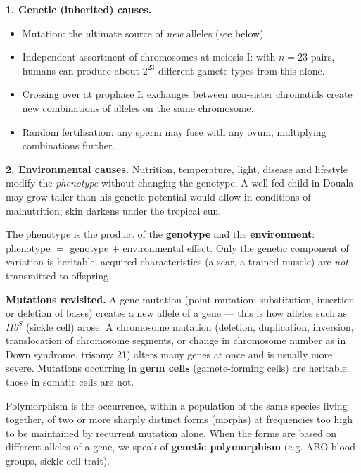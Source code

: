 \documentclass[11pt]{article}
\newcommand{\cle}[1]{{\popxbold\color{popdark}#1}}
\newcounter{popsec}
\newcounter{popsub}
\newcommand{\courssub}[1]{%
  \stepcounter{popsub}%
  \par\vspace{9pt}\noindent{\popxbold\fontsize{11.5}{13}\selectfont\color{popink}{\color{poporange}\thepopsec.\thepopsub}\hspace{6pt}#1}\par\nopagebreak\vspace{4pt}
}
\begin{document}
\textbf{1. Genetic (inherited) causes.}
\begin{itemize}
\item \cle{Mutation}: the ultimate source of \emph{new} alleles (see below).
\item \cle{Independent assortment} of chromosomes at meiosis I: with $n = 23$ pairs, humans can produce about $2^{23}$ different gamete types from this alone.
\item \cle{Crossing over} at prophase I: exchanges between non-sister chromatids create new combinations of alleles on the same chromosome.
\item \cle{Random fertilisation}: any sperm may fuse with any ovum, multiplying combinations further.
\end{itemize}

\textbf{2. Environmental causes.} Nutrition, temperature, light, disease and lifestyle modify the \emph{phenotype} without changing the genotype. A well-fed child in Douala may grow taller than his genetic potential would allow in conditions of malnutrition; skin darkens under the tropical sun.

\begin{definition}
The \cle{phenotype} is the product of the \textbf{genotype} and the \textbf{environment}: phenotype $=$ genotype $+$ environmental effect. Only the genetic component of variation is heritable; acquired characteristics (a scar, a trained muscle) are \emph{not} transmitted to offspring.
\end{definition}

\textbf{Mutations revisited.} A \cle{gene mutation} (point mutation: substitution, insertion or deletion of bases) creates a new allele of a gene --- this is how alleles such as $H\!b^S$ (sickle cell) arose. A \cle{chromosome mutation} (deletion, duplication, inversion, translocation of chromosome segments, or change in chromosome number as in Down syndrome, trisomy 21) alters many genes at once and is usually more severe. Mutations occurring in \textbf{germ cells} (gamete-forming cells) are heritable; those in somatic cells are not.

\courssub{Polymorphism}

\begin{definition}[Polymorphism]
\cle{Polymorphism} is the occurrence, within a population of the same species living together, of two or more sharply distinct forms (morphs) at frequencies too high to be maintained by recurrent mutation alone. When the forms are based on different alleles of a gene, we speak of \textbf{genetic polymorphism} (e.g. ABO blood groups, sickle cell trait).
\end{definition}
\end{document}
